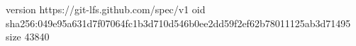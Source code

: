 version https://git-lfs.github.com/spec/v1
oid sha256:049e95a631d7f07064fc1b3d710d546b0ee2dd59f2ef62b78011125ab3d71495
size 43840

